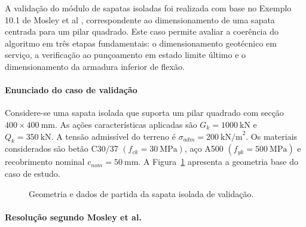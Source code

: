 A validação do módulo de sapatas isoladas foi realizada com base no Exemplo 10.1 de Mosley et al \cite{Mosley}, correspondente ao dimensionamento de uma sapata centrada para um pilar quadrado. Este caso permite avaliar a coerência do algoritmo em três etapas fundamentais: o dimensionamento geotécnico em serviço, a verificação ao punçoamento em estado limite último e o dimensionamento da armadura inferior de flexão.

\paragraph{Enunciado do caso de validação}

Considere-se uma sapata isolada que suporta um pilar quadrado com secção \(400 \times 400\ \text{mm}\). As ações características aplicadas são \(G_k = 1000\ \text{kN}\) e \(Q_k = 350\ \text{kN}\). A tensão admissível do terreno é \(\sigma_{adm}=200\ \text{kN/m}^2\). Os materiais considerados são betão C30/37 \((f_{ck}=30\ \text{MPa})\), aço A500 \((f_{yk}=500\ \text{MPa})\) e recobrimento nominal \(c_{nom}=50\ \text{mm}\). A Figura~\ref{fig:sapata_validacao_enunciado} apresenta a geometria base do caso de estudo.

\begin{figure}[H]
\centering
{}
\caption{Geometria e dados de partida da sapata isolada de validação.}
\label{fig:sapata_validacao_enunciado}
\end{figure}

\paragraph{Resolução segundo Mosley et al.}

